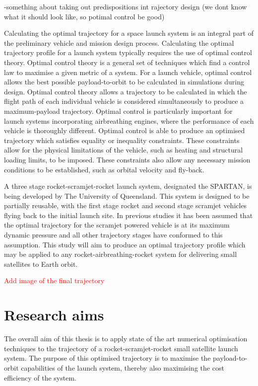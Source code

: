 -something about taking out predispositions int rajectory design (we dont know what it should look like, so potimal control be good)

  Calculating the optimal trajectory for a space launch system is an integral part of the preliminary vehicle and mission design process. Calculating the optimal trajectory profile for a launch system typically requires the use of optimal control theory. Optimal control theory is a general set of techniques which find a control law to maximise a given metric of a system. For a launch vehicle, optimal control allows the best possible payload-to-orbit to be calculated in simulations during design. 
Optimal control theory allows a trajectory to be calculated in which the flight path of each individual vehicle is considered simultaneously to produce a maximum-payload trajectory. 
Optimal control is particularly important for launch systems incorporating airbreathing engines, where the performance of each vehicle is thoroughly different. 
Optimal control is able to produce an optimised trajectory which satisfies equality or inequality constraints. These constraints allow for the physical limitations of the vehicle, such as heating and structural loading limits, to be imposed. These constraints also allow any necessary mission conditions to be established, such as orbital velocity and fly-back. 
  
  
  	   
  	   A three stage rocket-scramjet-rocket launch system, designated the SPARTAN, is being developed by The University of Queensland. This system is designed to be partially reusable, with the first stage rocket and second stage scramjet vehicles flying back to the initial launch site. 
  	   In previous studies it has been assumed that the optimal trajectory for the scramjet powered vehicle is at its
  	   maximum dynamic pressure and all other trajectory stages have conformed to this assumption. This study will aim to produce an optimal
  	   trajectory profile which may be applied to any rocket-airbreathing-rocket system for delivering small
  	   satellites to Earth orbit. 

  	\textcolor{red}{Add image of the final trajectory}
  \section{Research aims}

    The overall aim of this thesis is to apply state of the art numerical optimisation techniques to the trajectory of a rocket-scramjet-rocket small satellite launch system. The purpose of this optimised trajectory is to maximise the payload-to-orbit capabilities of the launch system, thereby also maximising the cost efficiency of the system. 
    
